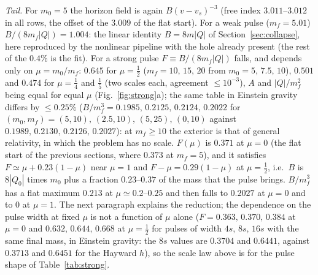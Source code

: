\documentclass[11pt]{article}
\begin{document}
\emph{Tail.} For $m_0=5$ the horizon field is again $B(v-v_s)^{-3}$ (free index $3.011$--$3.012$ in all rows, the offset of the $3.009$ of the flat start). For a weak pulse ($m_f=5.01$) $B/(8m_f|Q|)=1.004$: the linear identity $B=8m|Q|$ of Section~\ref{sec:collapse}, here reproduced by the nonlinear pipeline with the hole already present (the rest of the $0.4\%$ is the fit). For a strong pulse $F\equiv B/(8m_f|Q|)$ falls, and depends only on $\mu=m_0/m_f$: $0.645$ for $\mu=\tfrac12$ ($m_f=10,\,15,\,20$ from $m_0=5,\,7.5,\,10$), $0.501$ and $0.474$ for $\mu=\tfrac14$ and $\tfrac15$ (two scales each, agreement $\le10^{-3}$), $A$ and $|Q|/m_f^{2}$ being equal for equal $\mu$ (Fig.~\ref{fig:strong}a); the same table in Einstein gravity differs by $\le0.25\%$ ($B/m_f^{3}=0.1985,\,0.2125,\,0.2124,\,0.2022$ for $(m_0,m_f)=(5,10),\,(2.5,10),\,(5,25),\,(0,10)$ against $0.1989,\,0.2130,\,0.2126,\,0.2027$): at $m_f\ge10$ the exterior is that of general relativity, in which the problem has no scale. $F(\mu)$ is $0.371$ at $\mu=0$ (the flat start of the previous sections, where $0.373$ at $m_f=5$), and it satisfies $F\simeq\mu+0.23(1-\mu)$ near $\mu=1$ and $F-\mu=0.29(1-\mu)$ at $\mu=\tfrac12$, i.e.\ $B$ is $8|Q_0|$ times $m_0$ plus a fraction $0.23$--$0.37$ of the mass that the pulse brings. $B/m_f^{3}$ has a flat maximum $0.213$ at $\mu\simeq0.2$--$0.25$ and then falls to $0.2027$ at $\mu=0$ and to $0$ at $\mu=1$. The next paragraph explains the reduction; the dependence on the pulse width at fixed $\mu$ is not a function of $\mu$ alone ($F=0.363,\,0.370,\,0.384$ at $\mu=0$ and $0.632,\,0.644,\,0.668$ at $\mu=\tfrac12$ for pulses of width $4s,\,8s,\,16s$ with the same final mass, in Einstein gravity: the $8s$ values are $0.3704$ and $0.6441$, against $0.3713$ and $0.6451$ for the Hayward $h$), so the scale law above is for the pulse shape of Table~\ref{tab:strong}.
\end{document}
